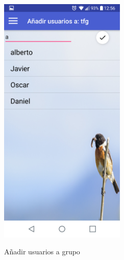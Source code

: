 \begin{figure}[htbp]
\begin{minipage}[b]{0.5\linewidth}
\end{minipage}
\hspace{0.5cm} %
\begin{minipage}[b]{0.5\linewidth}
\centering
\includegraphics[width=6cm]{capturamovil/addintegrante.png}
 \label{figura2}
\caption{Añadir usuarios a grupo }

\end{minipage}
\end{figure}


